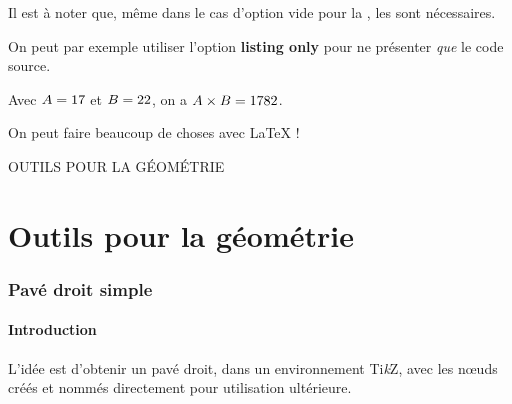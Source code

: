 \documentclass[a4paper,french,11pt]{article}
\providecommand\tikzlogo{Ti\textit{k}Z}
\let\TikZ\tikzlogo
\newcommand\ctex[1]{\tcbox[vignettelatex]{#1}}
\newcommand\Cle[1]{{\bfseries\sffamily\textlangle \textcolor{orange!75!black}{#1}\textrangle}}
\begin{document}
\begin{noteblock}
Il est à noter que, même dans le cas d'option vide pour la \ctex{tcolorbox}, les \ctex{\{\}} sont nécessaires.

\smallskip

On peut par exemple utiliser l'option \Cle{listing only} pour ne présenter \textit{que} le code source.
\end{noteblock}

\begin{PresCodePL}{}
\begin{PresentationCode}{}
\xdef\ValAleaA{\fpeval{randint(1,100)}}
\xdef\ValAleaB{\fpeval{randint(1,100)}}

Avec $A=\ValAleaA$ et $B=\ValAleaB$, on a $A\times B=\inteval{\ValAleaA * \ValAleaB}$.
\end{PresentationCode}

\begin{PresentationCode}[blue]{}
On peut faire beaucoup de choses avec \LaTeX{} !
\end{PresentationCode}
\end{PresCodePL}

\pagebreak

\phantom{t}\par\vfill\par
\begin{PART}
	\begin{center}
		\Huge\MakeUppercase{Outils pour la géométrie}
	\end{center}
\end{PART}
\par\vfill\par\phantom{t}

\newpage

\part{Outils pour la géométrie}

\section{Pavé droit \og simple \fg}\label{pave}

\subsection{Introduction}

\begin{tipblock}
L'idée est d'obtenir un pavé droit, dans un environnement \TikZ, avec les nœuds créés et nommés directement pour utilisation ultérieure.
\end{tipblock}
\end{document}
